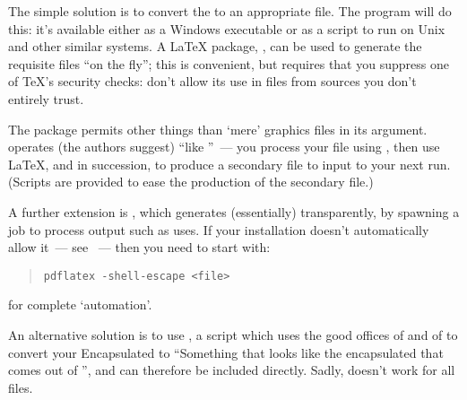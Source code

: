 The simple solution is to convert the  to an appropriate
 file.  The  program will do this: it's
available either as a Windows executable or as a 
script to run on Unix and other similar systems.  A \LaTeX{} package,
, can be used to generate the requisite 
files ``on the fly''; this is convenient, but requires that you
suppress one of \TeX{}'s security checks: don't allow its use in files
from sources you don't entirely trust.

The package  permits other things than `mere'
graphics files in its argument.   operates (the
authors suggest) ``like \BibTeX{}''~--- you process your file using
\PDFLaTeX{}, then use \LaTeX{},  and 
in succession, to produce a secondary file to input to your next
\PDFLaTeX{} run.  (Scripts are provided to ease the production of the
secondary file.)

A further extension is , which generates
 (essentially) transparently, by spawning a job to process
output such as  uses.  If your \pdflatex{}
installation doesn't automatically allow it~--- see %
~--- then you need to start
\pdflatex{} with:
\begin{quote}
\begin{verbatim}
pdflatex -shell-escape <file>
\end{verbatim}
\end{quote}
for complete `automation'.

An alternative solution is to use , a
 script which uses the good offices of
 and of \MP{} to convert your Encapsulated \PS{} to
``Something that looks like the encapsulated \PS{} that comes out of
\MP{}'', and can therefore be included directly.  Sadly,
 doesn't work for all  files.

